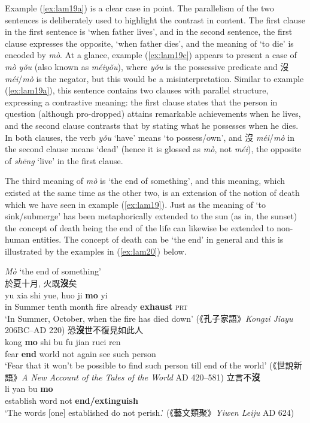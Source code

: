 \documentclass[output=paper]{langscibook}
\begin{document}
Example (\ref{ex:lam19a}) is a clear case in point. The parallelism of the two sentences is deliberately used to highlight the contrast in content. The first clause in the first sentence is `when father lives', and in the second sentence, the first clause expresses the opposite, `when father dies', and the meaning of `to die' is encoded by \textit{mò}. At a glance, example (\ref{ex:lam19c}) appears to present a case of \textit{mò yǒu} (also known as \textit{méiyǒu}), where \textit{yǒu} is the possessive predicate and 沒 \textit{méi}/\textit{mò} is the negator, but this would be a misinterpretation. Similar to example (\ref{ex:lam19a}), this sentence contains two clauses with parallel structure, expressing a contrastive meaning: the first clause states that the person in question (although pro-dropped) attains remarkable achievements when he lives, and the second clause contrasts that by stating what he possesses when he dies. In both clauses, the verb \textit{yǒu} `have' means `to possess/own', and 沒 \textit{méi}/\textit{mò} in the second clause means `dead' (hence it is glossed as \textit{mò}, not \textit{méi}), the opposite of \textit{shēng} `live' in the first clause. 

The third meaning of \textit{mò} is `the end of something', and this meaning, which existed at the same time as the other two, is an extension of the notion of death which we have seen in example (\ref{ex:lam19}). Just as the meaning of `to sink/submerge' has been metaphorically extended to the sun (as in, the sunset) the concept of death being the end of the life can likewise be extended to non-human entities. The concept of death can be `the end' in general and this is illustrated by the examples in (\ref{ex:lam20}) below. 

\ea \textit{Mò} `the end of something'  \label{ex:lam20}\\
  \ea 於夏十月, 火既\textbf{沒}矣 \label{ex:lam20a}\\
  	\gll yu xia shi yue, huo ji	\textbf{mo} yi\\
  	in	Summer	tenth	month fire already \textbf{exhaust} \textsc{prt}\\
  	\glt `In Summer, October, when the fire has died down' (《孔子家語》\emph{Kongzi Jiayu} 206BC–AD 220)  
  \ex 恐\textbf{沒}世不復見如此人 \label{ex:lam20b}\\
  	\gll kong \textbf{mo} shi bu fu jian ruci ren\\
  	fear \textbf{end} world not again	see	such person\\
  	\glt `Fear that it won't be possible to find such person till end of the world' (《世說新語》\emph{A New Account of the Tales of the World} AD 420–581)
  \ex 立言不\textbf{沒} \label{ex:lam20c}\\
	\gll li yan bu \textbf{mo}\\
	establish word not \textbf{end/extinguish}\\
	\glt `The words [one] established do not perish.' (《藝文類聚》\emph{Yiwen Leiju} AD 624)
\z \z
\end{document}
